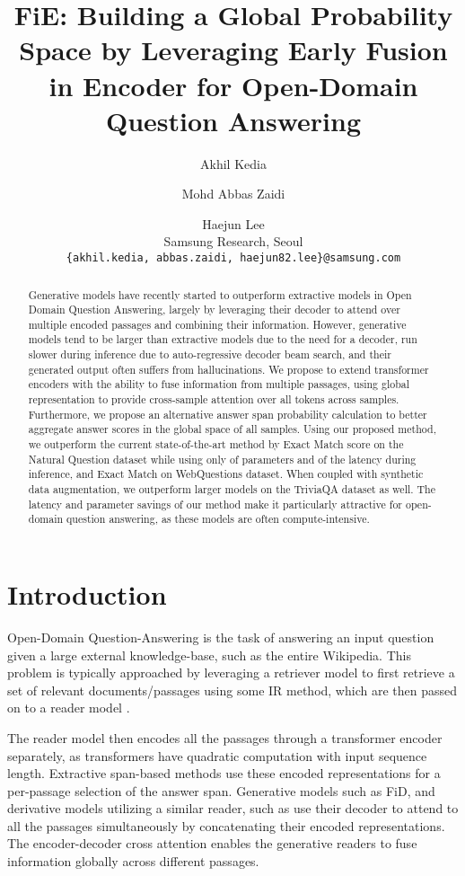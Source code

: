 \documentclass[11pt]{article}
\title{FiE: Building a Global Probability Space by Leveraging Early Fusion in Encoder for Open-Domain Question Answering}
\author{Akhil Kedia \and Mohd Abbas Zaidi \and Haejun Lee \\
        Samsung Research, Seoul \\
  \texttt{\{akhil.kedia, abbas.zaidi, haejun82.lee\}@samsung.com} \\}
\begin{document}
\maketitle



\begin{abstract}
Generative models have recently started to outperform extractive models in Open Domain Question Answering, largely by leveraging their decoder to attend over multiple encoded passages and combining their information. However, generative models tend to be larger than extractive models due to the need for a decoder, run slower during inference due to auto-regressive decoder beam search, and their generated output often suffers from hallucinations. We propose to extend transformer encoders with the ability to fuse information from multiple passages, using global representation to provide cross-sample attention over all tokens across samples. Furthermore, we propose an alternative answer span probability calculation to better aggregate answer scores in the global space of all samples. Using our proposed method, we outperform the current state-of-the-art method by  Exact Match score on the Natural Question dataset while using only  of parameters and  of the latency during inference, and  Exact Match on WebQuestions dataset. When coupled with synthetic data augmentation, we outperform larger models on the TriviaQA dataset as well. The latency and parameter savings of our method make it particularly attractive for open-domain question answering, as these models are often compute-intensive.
\end{abstract}
%
 \section{Introduction}

Open-Domain Question-Answering is the task of answering an input question given a large external knowledge-base, such as the entire Wikipedia. 
This problem is typically approached by leveraging a retriever model to first retrieve a set of relevant documents/passages using some IR method, which are then passed on to a reader model \cite{orqa, dpr, realm, rag, ance, realmplusplus}.

The reader model then encodes all the passages through a transformer encoder separately, as transformers have quadratic computation with input sequence length. Extractive span-based methods \cite{orqa, dpr, realm, rag, ance} use these encoded representations for a per-passage selection of the answer span. Generative models such as FiD\cite{fid}, and derivative models utilizing a similar reader, such as \citet{fidkd, e2nr, emdr2, yono} use their decoder to attend to all the passages simultaneously by concatenating their encoded representations. The encoder-decoder cross attention enables the generative readers to fuse information globally across different passages.
\end{document}
